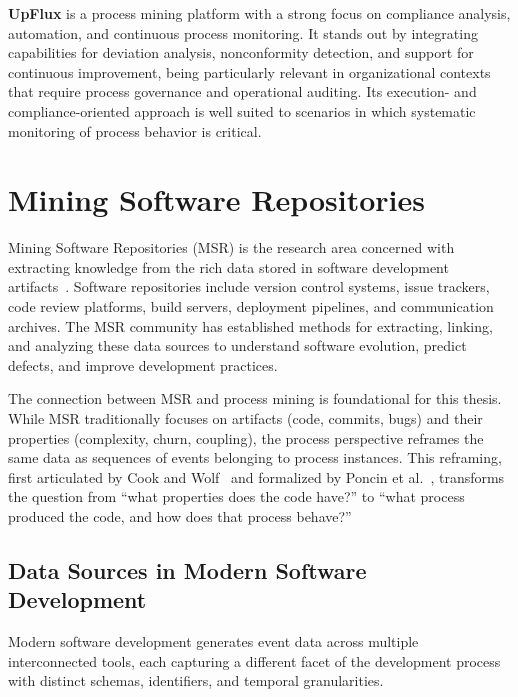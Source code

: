 \textbf{UpFlux} is a process mining platform with a strong focus on compliance analysis, automation, and continuous process monitoring. It stands out by integrating capabilities for deviation analysis, nonconformity detection, and support for continuous improvement, being particularly relevant in organizational contexts that require process governance and operational auditing. Its execution- and compliance-oriented approach is well suited to scenarios in which systematic monitoring of process behavior is critical.

\section{Mining Software Repositories}
\label{sec:msr}

Mining Software Repositories (MSR) is the research area concerned with
extracting knowledge from the rich data stored in software development
artifacts~\cite{hassan2008road, kagdi2007}. Software repositories
include version control systems, issue trackers, code review platforms,
build servers, deployment pipelines, and communication archives. The MSR
community has established methods for extracting, linking, and analyzing
these data sources to understand software evolution, predict defects, and
improve development practices.

The connection between MSR and process mining is foundational for this
thesis. While MSR traditionally focuses on artifacts (code, commits,
bugs) and their properties (complexity, churn, coupling), the process
perspective reframes the same data as sequences of events belonging to
process instances. This reframing, first articulated by Cook and
Wolf~\cite{cook1998} and formalized by
Poncin et al.~\cite{poncin2011process}, transforms the question from
``what properties does the code have?'' to ``what process produced the
code, and how does that process behave?''


\subsection{Data Sources in Modern Software Development}
\label{sec:msr-data-sources}

Modern software development generates event data across multiple interconnected tools, each capturing a different facet of the development process with distinct schemas, identifiers, and temporal granularities.

